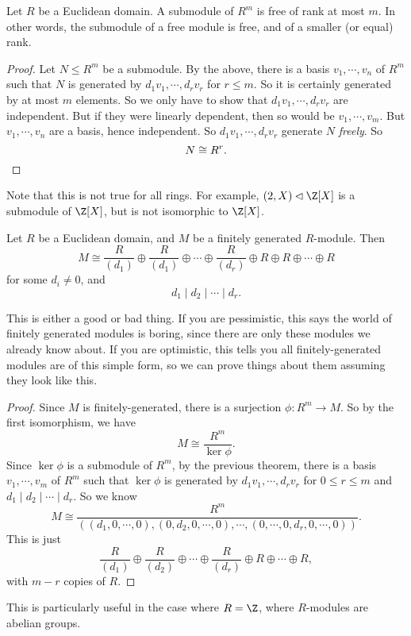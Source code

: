 \documentclass[a4paper]{article}
\begin{document}
\begin{cor}
  Let $R$ be a Euclidean domain. A submodule of $R^m$ is free of rank at most $m$. In other words, the submodule of a free module is free, and of a smaller (or equal) rank.
\end{cor}

\begin{proof}
  Let $N \leq R^m$ be a submodule. By the above, there is a basis $v_1, \cdots, v_n$ of $R^m$ such that $N$ is generated by $d_1 v_1, \cdots, d_r v_r$ for $r \leq m$. So it is certainly generated by at most $m$ elements. So we only have to show that $d_1 v_1, \cdots, d_r v_r$ are independent. But if they were linearly dependent, then so would be $v_1, \cdots, v_m$. But $v_1, \cdots, v_n$ are a basis, hence independent. So $d_1 v_1, \cdots, d_r v_r$ generate $N$ \emph{freely}. So
  \[
    N \cong R^r.\qedhere
  \]
\end{proof}
Note that this is not true for all rings. For example, $(2, X) \lhd \Z[X]$ is a submodule of $\Z[X]$, but is not isomorphic to $\Z[X]$.

\begin{thm}
  Let $R$ be a Euclidean domain, and $M$ be a finitely generated $R$-module. Then
  \[
    M \cong \frac{R}{(d_1)} \oplus \frac{R}{(d_1)} \oplus \cdots \oplus\frac{R}{(d_r)} \oplus R \oplus R \oplus \cdots \oplus R
  \]
  for some $d_i \not= 0$, and
  \[
    d_1 \mid d_2 \mid \cdots \mid d_r.
  \]
\end{thm}
This is either a good or bad thing. If you are pessimistic, this says the world of finitely generated modules is boring, since there are only these modules we already know about. If you are optimistic, this tells you all finitely-generated modules are of this simple form, so we can prove things about them assuming they look like this.

\begin{proof}
  Since $M$ is finitely-generated, there is a surjection $\phi: R^m \to M$. So by the first isomorphism, we have
  \[
    M \cong \frac{R^m}{\ker \phi}.
  \]
  Since $\ker \phi$ is a submodule of $R^m$, by the previous theorem, there is a basis $v_1, \cdots, v_m$ of $R^m$ such that $\ker \phi$ is generated by $d_1 v_1, \cdots, d_r v_r$ for $0 \leq r \leq m$ and $d_1 \mid d_2 \mid \cdots \mid d_r$. So we know
  \[
    M \cong \frac{R^m}{((d_1, 0, \cdots, 0), (0, d_2, 0, \cdots, 0), \cdots, (0, \cdots, 0, d_r, 0, \cdots, 0))}.
  \]
  This is just
  \[
    \frac{R}{(d_1)} \oplus \frac{R}{(d_2)} \oplus \cdots \oplus \frac{R}{(d_r)} \oplus R \oplus \cdots \oplus R,
  \]
  with $m - r$ copies of $R$.
\end{proof}
This is particularly useful in the case where $R = \Z$, where $R$-modules are abelian groups.
\end{document}
